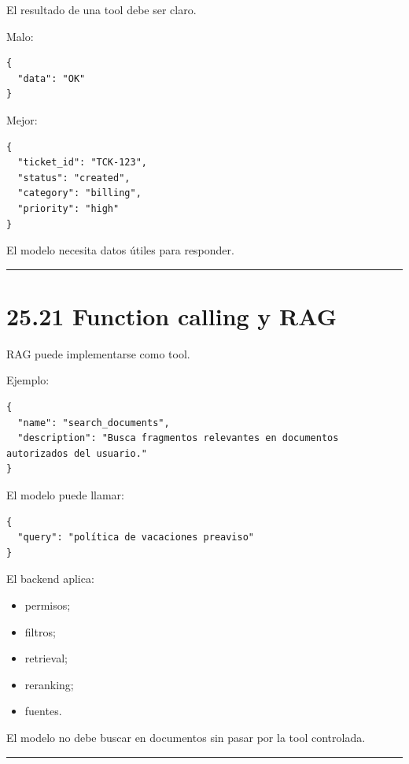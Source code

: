 El resultado de una tool debe ser claro.

Malo:

\begin{lstlisting}
{
  "data": "OK"
}
\end{lstlisting}

Mejor:

\begin{lstlisting}
{
  "ticket_id": "TCK-123",
  "status": "created",
  "category": "billing",
  "priority": "high"
}
\end{lstlisting}

El modelo necesita datos útiles para responder.

\begin{center}\rule{0.5\linewidth}{0.5pt}\end{center}

\section{25.21 Function calling y RAG}\label{function-calling-y-rag}

RAG puede implementarse como tool.

Ejemplo:

\begin{lstlisting}
{
  "name": "search_documents",
  "description": "Busca fragmentos relevantes en documentos autorizados del usuario."
}
\end{lstlisting}

El modelo puede llamar:

\begin{lstlisting}
{
  "query": "política de vacaciones preaviso"
}
\end{lstlisting}

El backend aplica:

\begin{itemize}
\tightlist
\item
  permisos;
\item
  filtros;
\item
  retrieval;
\item
  reranking;
\item
  fuentes.
\end{itemize}

El modelo no debe buscar en documentos sin pasar por la tool controlada.

\begin{center}\rule{0.5\linewidth}{0.5pt}\end{center}

